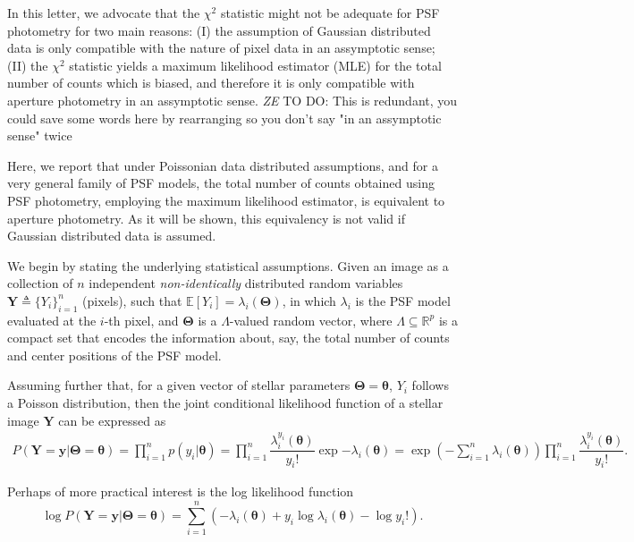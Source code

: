 \documentclass{rnaastex}
\newcommand{\todo}[3]{{\color{#2} \emph{#1} TO DO: #3}}
\newcommand{\zetodo}[1]{\todo{ZE}{cyan}{#1}}
\begin{document}
In this letter, we advocate that the $\chi^2$ statistic might not be adequate
for PSF photometry for two main reasons: (I) the assumption of Gaussian
distributed data is only compatible with the nature of pixel data in an
assymptotic sense; (II) the $\chi^2$ statistic yields a maximum likelihood
estimator (MLE) for the total number of counts which is biased, and therefore
it is only compatible with aperture photometry in an assymptotic sense. 
\zetodo{This is redundant, you could save some words here by rearranging 
so you don't say "in an assymptotic sense" twice}

Here, we report that under Poissonian data distributed assumptions,
and for a very general family of PSF models, the total number of counts
obtained using PSF photometry, employing the maximum likelihood estimator, is
equivalent to aperture photometry. As it will be shown, this equivalency is not
valid if Gaussian distributed data is assumed.

We begin by stating the underlying statistical assumptions.
Given an image as a collection of $n$ independent \emph{non-identically}
distributed random variables $\bm{Y} \triangleq \{Y_i\}_{i=1}^{n}$ (pixels),
such that $\mathbb{E}\left[Y_i\right] = \lambda_i(\bm{\Theta})$, in which
$\lambda_i$ is the PSF model evaluated at the $i$-th pixel, and $\bm{\Theta}$
is a $\Lambda$-valued random vector, where $\Lambda \subseteq \mathbb{R}^p$ is
a compact set that encodes the information about, say, the total number of
counts and center positions of the PSF model.

Assuming further that, for a given vector of stellar parameters
$\bm{\Theta} = \bm{\theta}$, $Y_i$ follows a Poisson distribution, then the
joint conditional likelihood function of a stellar image $\bm{Y}$ can be
expressed as~\citep{grimmett:2001}
\begin{align}
    P(\bm{Y} = \bm{y} | \bm{\Theta} = \bm{\theta}) =
    \prod_{i=1}^{n} p(y_i | \bm{\theta}) =
    \prod_{i=1}^{n}\dfrac{\lambda_i^{y_i}(\bm{\theta})}{y_i!}\exp{-\lambda_i(\bm{\theta})} =
    \exp\left({-\sum_{i=1}^{n}\lambda_i(\bm{\theta})}\right)\prod_{i=1}^{n}\dfrac{\lambda_i^{y_i}(\bm{\theta})}{y_i!}.
\end{align}

Perhaps of more practical interest is the log likelihood function
\begin{equation}
    \log P(\bm{Y} = \bm{y} | \bm{\Theta} = \bm{\theta}) =
    \sum_{i=1}^{n}\left(- \lambda_i(\bm{\theta})
    + y_i\log\lambda_i(\bm{\theta}) - \log y_i !\right).
\end{equation}
\end{document}
